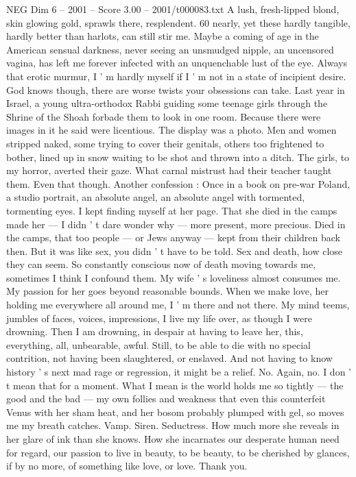 \begin{textsample}{NEG Dim 6 – 2001 – Score 3.00 – 2001/t000083.txt}
A lush, fresh-lipped blond, skin glowing gold, sprawls there, resplendent. 60 nearly, yet these hardly tangible, hardly better than harlots, can still stir me.
Maybe a coming of age in the American sensual darkness, never seeing an unsmudged nipple, an uncensored vagina, has left me forever infected with an unquenchable lust of the eye.
Always that erotic murmur, I ' m hardly myself if I ' m not in a state of incipient desire.
God knows though, there are worse twists your obsessions can take.
Last year in Israel, a young ultra-orthodox Rabbi guiding some teenage girls through the Shrine of the Shoah forbade them to look in one room.
Because there were images in it he said were licentious.
The display was a photo.
Men and women stripped naked, some trying to cover their genitals, others too frightened to bother, lined up in snow waiting to be shot and thrown into a ditch.
The girls, to my horror, averted their gaze.
What carnal mistrust had their teacher taught them.
Even that though.
Another confession : Once in a book on pre-war Poland, a studio portrait, an absolute angel, an absolute angel with tormented, tormenting eyes.
I kept finding myself at her page.
That she died in the camps made her — I didn ' t dare wonder why — more present, more precious.
Died in the camps, that too people — or Jews anyway — kept from their children back then.
But it was like sex, you didn ' t have to be told.
Sex and death, how close they can seem.
So constantly conscious now of death moving towards me, sometimes I think I confound them.
My wife ' s loveliness almost consumes me.
My passion for her goes beyond reasonable bounds.
When we make love, her holding me everywhere all around me, I ' m there and not there.
My mind teems, jumbles of faces, voices, impressions, I live my life over, as though I were drowning.
Then I am drowning, in despair at having to leave her, this, everything, all, unbearable, awful.
Still, to be able to die with no special contrition, not having been slaughtered, or enslaved.
And not having to know history ' s next mad rage or regression, it might be a relief.
No.
Again, no.
I don ' t mean that for a moment.
What I mean is the world holds me so tightly — the good and the bad — my own follies and weakness that even this counterfeit Venus with her sham heat, and her bosom probably plumped with gel, so moves me my breath catches.
Vamp.
Siren.
Seductress.
How much more she reveals in her glare of ink than she knows.
How she incarnates our desperate human need for regard, our passion to live in beauty, to be beauty, to be cherished by glances, if by no more, of something like love, or love.
Thank you.

\end{textsample}
